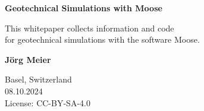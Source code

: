 \begin{titlepage}
    \begin{flushright}
    \end{flushright}
    \begin{center}
        \vspace*{5cm}
 
        {\Huge\textbf{Geotechnical Simulations with Moose}}
        
 
        \vspace{5cm}
             
        \vfill
             
        \large{This whitepaper collects information and code \\
        for geotechnical simulations with the software Moose.}
             
        \vfill
      
                
        \textbf{Jörg Meier}
       
        Basel, Switzerland\\

        \vspace{1cm}
        08.10.2024\\

        \vspace{1cm}
        License: CC-BY-SA-4.0
             
    \end{center}
 \end{titlepage}